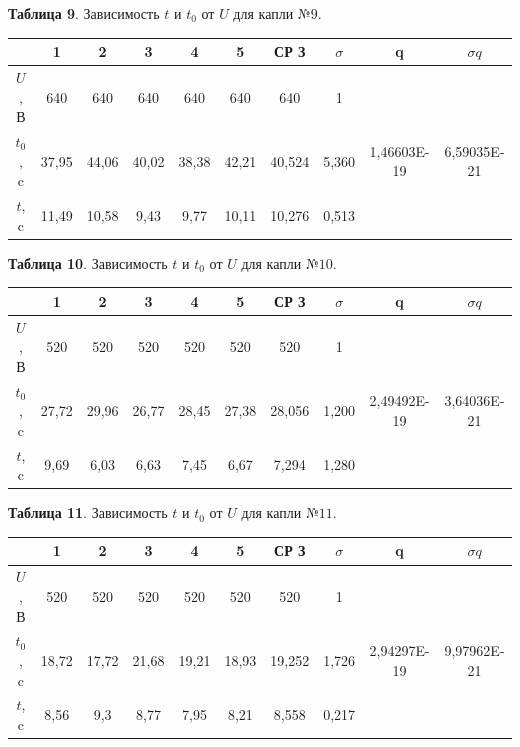 \documentclass[11pt,a4paper]{article}
\begin{document}
\space\begin{table}
	\begin{center}
		\textbf{Таблица 9}. Зависимость $t$ и $t_0$ от $U$ для капли $№9$.\\
	\begin{tabular}{|c|c|c|c|c|c|c|c|c|c|}
		
			\hline
			 & \textbf{1} & \textbf{2} & \textbf{3} &\textbf{4} &\textbf{5} & СР З & $\sigma$  & q& $\sigma q$ \\ \hline
			$U$, В & 640 & 640 & 640 & 640 & 640 &  640 &  1 \\ \hline
			$t_0$, c  & 37,95 & 44,06 & 40,02 & 38,38 & 42,21 & 40,524  & 5,360 & 1,46603E-19
 & 6,59035E-21
\\ \hline
			$t$, c   & 11,49 & 10,58 & 9,43 & 9,77 & 10,11 & 10,276 & 0,513\\ \hline
	\end{tabular}
	\end{center}
\end{table}
\space\begin{table}
	\begin{center}
		\textbf{Таблица 10}. Зависимость $t$ и $t_0$ от $U$ для капли $№10$.\\
	\begin{tabular}{|c|c|c|c|c|c|c|c|c|c|}
		
			\hline
			 & \textbf{1} & \textbf{2} & \textbf{3} &\textbf{4} &\textbf{5} & СР З & $\sigma$  & q& $\sigma q$  \\ \hline
			$U$, В & 520 & 520 & 520 & 520 & 520 &  520 &  1 \\ \hline
			$t_0$, c  & 27,72 & 29,96 & 26,77 & 28,45 & 27,38 & 28,056  & 1,200 &2,49492E-19
 & 3,64036E-21
\\ \hline
			$t$, c   & 9,69 & 6,03 & 6,63 & 7,45 & 6,67 & 7,294 & 1,280 \\ \hline
	\end{tabular}
	\end{center}
\end{table}
\space\begin{table}
	\begin{center}
		\textbf{Таблица 11}. Зависимость $t$ и $t_0$ от $U$ для капли $№11$.\\
	\begin{tabular}{|c|c|c|c|c|c|c|c|c|c|}
		
			\hline
			 & \textbf{1} & \textbf{2} & \textbf{3} &\textbf{4} &\textbf{5} & СР З & $\sigma$  & q& $\sigma q$ \\ \hline
			$U$, В & 520 & 520 & 520 & 520 & 520 &  520 &  1 \\ \hline
			$t_0$, c  & 18,72 & 17,72 & 21,68 & 19,21 & 18,93 & 19,252  & 1,726 & 2,94297E-19
			& 9,97962E-21
\\ \hline
			$t$, c   & 8,56 & 9,3 & 8,77 & 7,95 & 8,21 & 8,558 & 0,217\\ \hline
	\end{tabular}
	\end{center}
\end{table}
\end{document}
